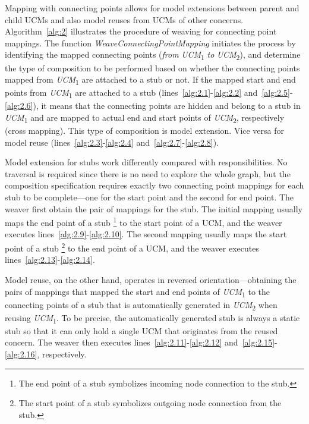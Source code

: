 Mapping with connecting points allows for model extensions between parent and child UCMs and also model reuses from UCMs of other concerns. Algorithm~\ref{alg:2} illustrates the procedure of weaving for connecting point mappings. The function \emph{WeaveConnectingPointMapping} initiates the process by identifying the mapped connecting points (\emph{from} \emph{UCM}\textsubscript{1} \emph{to} \emph{UCM}\textsubscript{2}), and determine the type of composition to be performed based on whether the connecting points mapped from \emph{UCM}\textsubscript{1} are attached to a stub or not. If the mapped start and end points from \emph{UCM}\textsubscript{1} are attached to a stub (lines~\ref{alg:2.1}-\ref{alg:2.2} and~\ref{alg:2.5}-\ref{alg:2.6}), it means that the connecting points are hidden and belong to a stub in \emph{UCM}\textsubscript{1} and are mapped to actual end and start points of \emph{UCM}\textsubscript{2}, respectively (cross mapping). This type of composition is model extension. Vice versa for model reuse (lines~\ref{alg:2.3}-\ref{alg:2.4} and~\ref{alg:2.7}-\ref{alg:2.8}).

Model extension for stubs work differently compared with responsibilities. No traversal is required since there is no need to explore the whole graph, but the composition specification requires exactly two connecting point mappings for each stub to be complete---one for the start point and the second for end point. The weaver first obtain the pair of mappings for the stub. The initial mapping usually maps the end point of a stub \footnote{The end point of a stub symbolizes incoming node connection to the stub.} to the start point of a UCM, and the weaver executes lines~\ref{alg:2.9}-\ref{alg:2.10}. The second mapping usually maps the start point of a stub \footnote{The start point of a stub symbolizes outgoing node connection from the stub.} to the end point of a UCM, and the weaver executes lines~\ref{alg:2.13}-\ref{alg:2.14}.

Model reuse, on the other hand, operates in reversed orientation---obtaining the pairs of mappings that mapped the start and end points of \emph{UCM}\textsubscript{1} to the connecting points of a stub that is automatically generated in \emph{UCM}\textsubscript{2} when reusing \emph{UCM}\textsubscript{1}. To be precise, the automatically generated stub is always a static stub so that it can only hold a single UCM that originates from the reused concern. The weaver then executes lines~\ref{alg:2.11}-\ref{alg:2.12} and~\ref{alg:2.15}-\ref{alg:2.16}, respectively.

